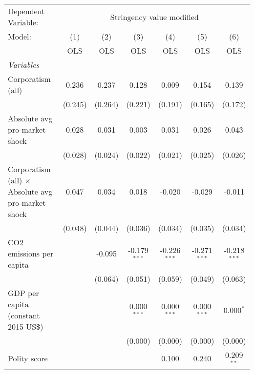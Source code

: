 
\begingroup
\centering
\begin{tabular}{lcccccc}
   \toprule
   Dependent Variable: & \multicolumn{6}{c}{Stringency value modified}\\
   Model:                                                    & (1)     & (2)     & (3)            & (4)            & (5)            & (6)\\  
                                                             &  OLS    & OLS     & OLS            & OLS            & OLS            & OLS\\  
   \midrule
   \emph{Variables}\\
   Corporatism (all)                                         & 0.236   & 0.237   & 0.128          & 0.009          & 0.154          & 0.139\\   
                                                             & (0.245) & (0.264) & (0.221)        & (0.191)        & (0.165)        & (0.172)\\   
   Absolute avg pro-market shock                             & 0.028   & 0.031   & 0.003          & 0.031          & 0.026          & 0.043\\   
                                                             & (0.028) & (0.024) & (0.022)        & (0.021)        & (0.025)        & (0.026)\\   
   Corporatism (all) $\times$ Absolute avg pro-market shock  & 0.047   & 0.034   & 0.018          & -0.020         & -0.029         & -0.011\\   
                                                             & (0.048) & (0.044) & (0.036)        & (0.034)        & (0.035)        & (0.034)\\   
   CO2 emissions per capita                                  &         & -0.095  & -0.179$^{***}$ & -0.226$^{***}$ & -0.271$^{***}$ & -0.218$^{***}$\\   
                                                             &         & (0.064) & (0.051)        & (0.059)        & (0.049)        & (0.063)\\   
   GDP per capita (constant 2015 US\$)                       &         &         & 0.000$^{***}$  & 0.000$^{***}$  & 0.000$^{***}$  & 0.000$^{*}$\\   
                                                             &         &         & (0.000)        & (0.000)        & (0.000)        & (0.000)\\   
   Polity score                                              &         &         &                & 0.100          & 0.240          & 0.209$^{**}$\\   

\end{tabular}
